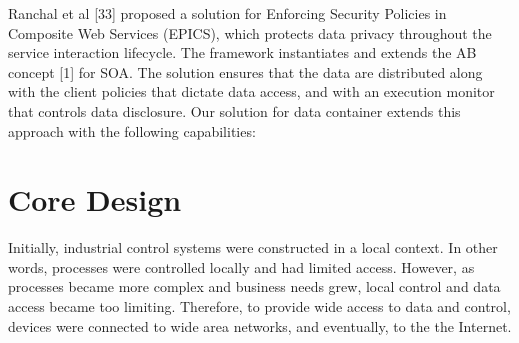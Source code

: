 \documentclass[conference]{IEEEtran}
\begin{document}

Ranchal et al [33] proposed a solution for Enforcing Security Policies in Composite Web Services (EPICS), which protects data privacy throughout the service interaction lifecycle. The framework instantiates and extends the AB concept [1] for SOA. The solution ensures that the data are distributed along with the client policies that dictate data access, and with an execution monitor that controls data disclosure. Our solution for data container extends this approach with the following capabilities:
                                                                            
\section{Core Design}
Initially, industrial control systems were constructed in a local context.  In other words, processes were controlled locally and had limited access.  However, as processes became more complex and business needs grew, local control and data access became too limiting.  Therefore, to provide wide access to data and control, devices were connected to wide area networks, and eventually, to the the Internet.
\end{document}
